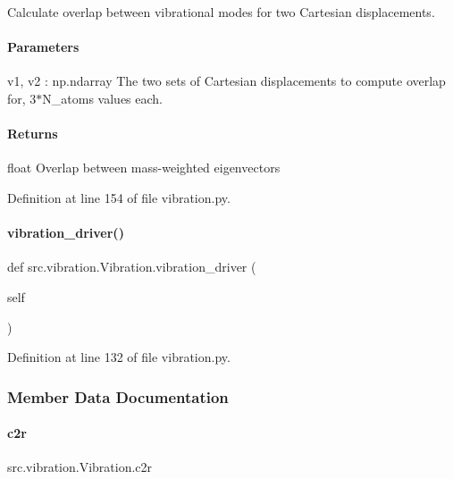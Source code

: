 Calculate overlap between vibrational modes for two Cartesian displacements. 

\paragraph*{Parameters }

v1, v2 \+: np.\+ndarray The two sets of Cartesian displacements to compute overlap for, 3$\ast$\+N\+\_\+atoms values each.

\paragraph*{Returns }

float Overlap between mass-\/weighted eigenvectors 

Definition at line 154 of file vibration.\+py.

\mbox{\label{classsrc_1_1vibration_1_1Vibration_aa7455f8e79497db19104240d75caec63}} 
\paragraph{\texorpdfstring{vibration\+\_\+driver()}{vibration\_driver()}}
{\footnotesize\ttfamily def src.\+vibration.\+Vibration.\+vibration\+\_\+driver (\begin{DoxyParamCaption}\item[{}]{self }\end{DoxyParamCaption})}



Definition at line 132 of file vibration.\+py.



\subsubsection{Member Data Documentation}
\mbox{\label{classsrc_1_1vibration_1_1Vibration_a0cf6ea114a083a6d6dae49454465594e}} 
\paragraph{\texorpdfstring{c2r}{c2r}}
{\footnotesize\ttfamily src.\+vibration.\+Vibration.\+c2r}



